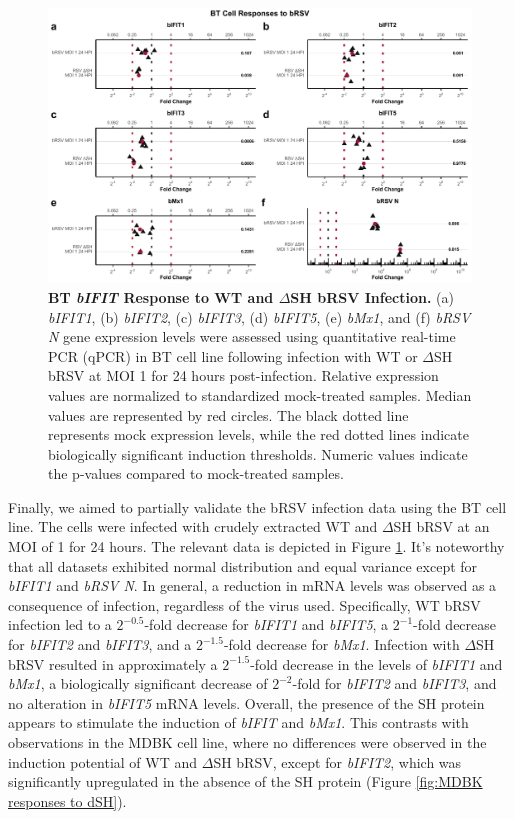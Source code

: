 \begin{figure}
    \centering
    \includegraphics[width=1\linewidth]{07. Chapter 2/Figs/02. Induction/09. bt_brsv.pdf}
    \caption[BT \textit{bIFIT} Response to WT and \(\Delta\)SH bRSV Infection.]{\textbf{BT \textit{bIFIT} Response to WT and \(\Delta\)SH bRSV Infection.} (a) \textit{bIFIT1}, (b) \textit{bIFIT2}, (c) \textit{bIFIT3}, (d) \textit{bIFIT5}, (e) \textit{bMx1}, and (f) \textit{bRSV N} gene expression levels were assessed using quantitative real-time PCR (qPCR) in BT cell line following infection with WT or \(\Delta\)SH bRSV at MOI 1 for 24 hours post-infection. Relative expression values are normalized to standardized mock-treated samples. Median values are represented by red circles. The black dotted line represents mock expression levels, while the red dotted lines indicate biologically significant induction thresholds. Numeric values indicate the p-values compared to mock-treated samples.}
    \label{fig:BT responses to bRSV}
\end{figure}

Finally, we aimed to partially validate the bRSV infection data using the BT cell line. The cells were infected with crudely extracted WT and \(\Delta\)SH bRSV at an MOI of 1 for 24 hours. The relevant data is depicted in Figure \ref{fig:BT responses to bRSV}. It's noteworthy that all datasets exhibited normal distribution and equal variance except for \textit{bIFIT1} and \textit{bRSV N}. In general, a reduction in mRNA levels was observed as a consequence of infection, regardless of the virus used. Specifically, WT bRSV infection led to a \(2^{-0.5}\)-fold decrease for \textit{bIFIT1} and \textit{bIFIT5}, a \(2^{-1}\)-fold decrease for \textit{bIFIT2} and \textit{bIFIT3}, and a \(2^{-1.5}\)-fold decrease for \textit{bMx1}. Infection with \(\Delta\)SH bRSV resulted in approximately a \(2^{-1.5}\)-fold decrease in the levels of \textit{bIFIT1} and \textit{bMx1}, a biologically significant decrease of \(2^{-2}\)-fold for \textit{bIFIT2} and \textit{bIFIT3}, and no alteration in \textit{bIFIT5} mRNA levels. Overall, the presence of the SH protein appears to stimulate the induction of \textit{bIFIT} and \textit{bMx1}. This contrasts with observations in the MDBK cell line, where no differences were observed in the induction potential of WT and \(\Delta\)SH bRSV, except for \textit{bIFIT2}, which was significantly upregulated in the absence of the SH protein (Figure \ref{fig:MDBK responses to dSH}).

